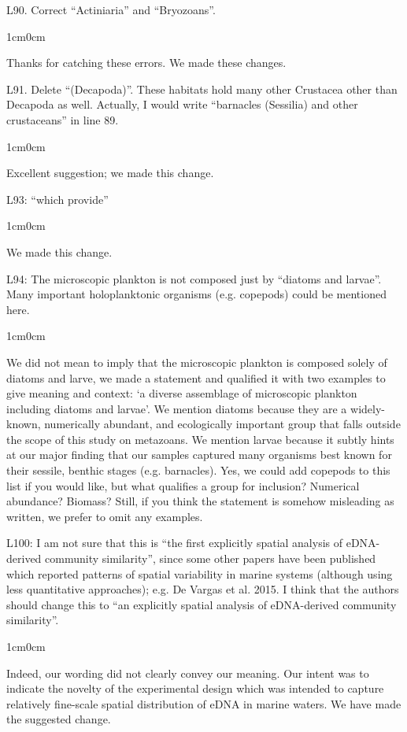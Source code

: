 \documentclass{article}
\newenvironment{response}
	{
	\begin{adjustwidth}{1cm}{0cm}
	\color{peerjBlue}
	}
	{
	\end{adjustwidth}
	}
\begin{document}
L90. Correct ``Actiniaria'' and ``Bryozoans''.
\begin{response}
  Thanks for catching these errors. We made these changes.\\
\end{response}

L91. Delete ``(Decapoda)''. These habitats hold many other Crustacea other than Decapoda as well. Actually, I would write ``barnacles (Sessilia) and other crustaceans'' in line 89.
\begin{response}
  Excellent suggestion; we made this change.\\
\end{response}

L93: ``which provide''
\begin{response}
  We made this change.\\
\end{response}

L94: The microscopic plankton is not composed just by ``diatoms and larvae''. Many important holoplanktonic organisms (e.g. copepods) could be mentioned here.
\begin{response}
  We did not mean to imply that the microscopic plankton is composed solely of diatoms and larve, we made a  statement and qualified it with two examples to give meaning and context: `a diverse assemblage of microscopic plankton including diatoms and larvae'.
	We mention diatoms because they are a widely-known, numerically abundant, and ecologically important group that falls outside the scope of this study on metazoans.
	We mention larvae because it subtly hints at our major finding that our samples captured many organisms best known for their sessile, benthic stages (e.g. barnacles).
	Yes, we could add copepods to this list if you would like, but what qualifies a group for inclusion? Numerical abundance? Biomass?
	Still, if you think the statement is somehow misleading as written, we prefer to omit any examples.\\
\end{response}

L100: I am not sure that this is ``the first explicitly spatial analysis of eDNA-derived community similarity'', since some other papers have been published which reported patterns of spatial variability in marine systems (although using less quantitative approaches); e.g. De Vargas et al. 2015. I think that the authors should change this to ``an explicitly spatial analysis of eDNA-derived community similarity''.
\begin{response}
  Indeed, our wording did not clearly convey our meaning. Our intent was to indicate the novelty of the experimental design which was intended to capture relatively fine-scale spatial distribution of eDNA in marine waters. We have made the suggested change.\\
\end{response}
\end{document}
